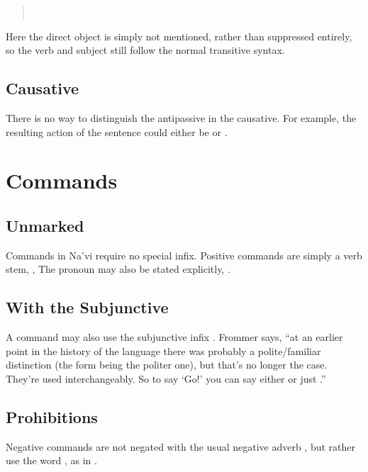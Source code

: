 \begin{quotation}
\noindent{} \\
\noindent{} 
\end{quotation}

\noindent Here the direct object is simply not mentioned, rather than
suppressed entirely, so the verb and subject still follow the normal
transitive syntax.

\subsection{Causative} There is no way to distinguish the antipassive
in the causa\-tive.  For example, the resulting action of the sentence
  could either be 
 or  .


\section{Commands}
\subsection{Unmarked} Commands in Na'vi require no special infix.
Positive commands are simply a verb stem,  , 
   The pronoun may also be stated
explicitly,  .

\subsection{With the Subjunctive} A command may also use the
subjunctive infix . Frommer says, ``at an earlier point in
the history of the language there was probably a polite/familiar
distinction (the  form being the politer one), but that's no
longer the case. They're used interchangeably.  So to say `Go!' you can
say either  or just .''

\subsection{Prohibitions} Negative commands are not negated with the
usual negative adverb , but rather use the word , as in
 .
\label{syntax:prohibitions}

